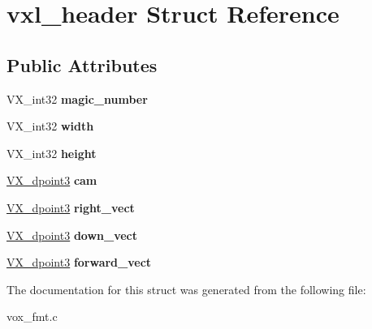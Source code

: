 \hypertarget{structvxl__header}{\section{vxl\-\_\-header Struct Reference}
\label{structvxl__header}
}
\subsection*{Public Attributes}
\begin{DoxyCompactItemize}
\item 
\hypertarget{structvxl__header_a31b0960fb3b28cbd25fae51261580349}{V\-X\-\_\-int32 {\bfseries magic\-\_\-number}}\label{structvxl__header_a31b0960fb3b28cbd25fae51261580349}

\item 
\hypertarget{structvxl__header_a32936b426ce0cd2942b5404fc66e6972}{V\-X\-\_\-int32 {\bfseries width}}\label{structvxl__header_a32936b426ce0cd2942b5404fc66e6972}

\item 
\hypertarget{structvxl__header_aab35354cc6b4ebe6553981a2b6058dd1}{V\-X\-\_\-int32 {\bfseries height}}\label{structvxl__header_aab35354cc6b4ebe6553981a2b6058dd1}

\item 
\hypertarget{structvxl__header_a23772a6c0ae7b47dd14721852ddbd558}{\hyperlink{structVX__dpoint3}{V\-X\-\_\-dpoint3} {\bfseries cam}}\label{structvxl__header_a23772a6c0ae7b47dd14721852ddbd558}

\item 
\hypertarget{structvxl__header_ab8ab28aa10e00a75fbc5ab8a5055ed05}{\hyperlink{structVX__dpoint3}{V\-X\-\_\-dpoint3} {\bfseries right\-\_\-vect}}\label{structvxl__header_ab8ab28aa10e00a75fbc5ab8a5055ed05}

\item 
\hypertarget{structvxl__header_acbbf83df0615acc14eef268ef3e029a5}{\hyperlink{structVX__dpoint3}{V\-X\-\_\-dpoint3} {\bfseries down\-\_\-vect}}\label{structvxl__header_acbbf83df0615acc14eef268ef3e029a5}

\item 
\hypertarget{structvxl__header_ac80564a3776625cb3feb4259b1ff0319}{\hyperlink{structVX__dpoint3}{V\-X\-\_\-dpoint3} {\bfseries forward\-\_\-vect}}\label{structvxl__header_ac80564a3776625cb3feb4259b1ff0319}

\end{DoxyCompactItemize}


The documentation for this struct was generated from the following file\-:\begin{DoxyCompactItemize}
\item 
vox\-\_\-fmt.\-c\end{DoxyCompactItemize}
